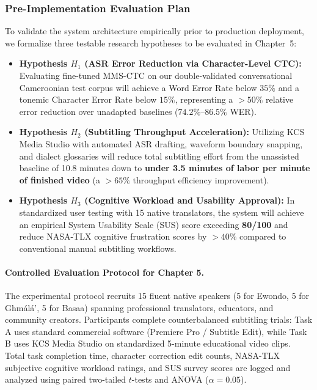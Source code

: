 \documentclass[a4paper,11pt]{article}
\begin{document}
\subsubsection{Pre-Implementation Evaluation Plan}
\label{sec:chap3_gov_evalplan}
To validate the system architecture empirically prior to production deployment, we formalize three testable research hypotheses to be evaluated in Chapter~5:
\begin{itemize}
    \item \textbf{Hypothesis $H_1$ (ASR Error Reduction via Character-Level CTC):} Evaluating fine-tuned MMS-CTC on our double-validated conversational Cameroonian test corpus will achieve a Word Error Rate below $35\%$ and a tonemic Character Error Rate below $15\%$, representing a $>50\%$ relative error reduction over unadapted baselines ($74.2\%\text{--}86.5\%$ WER).
    \item \textbf{Hypothesis $H_2$ (Subtitling Throughput Acceleration):} Utilizing KCS Media Studio with automated ASR drafting, waveform boundary snapping, and dialect glossaries will reduce total subtitling effort from the unassisted baseline of 10.8 minutes down to \textbf{under 3.5 minutes of labor per minute of finished video} (a $>65\%$ throughput efficiency improvement).
    \item \textbf{Hypothesis $H_3$ (Cognitive Workload and Usability Approval):} In standardized user testing with 15 native translators, the system will achieve an empirical System Usability Scale (SUS) score exceeding \textbf{80/100} and reduce NASA-TLX cognitive frustration scores by $>40\%$ compared to conventional manual subtitling workflows.
\end{itemize}

\paragraph{Controlled Evaluation Protocol for Chapter 5.}
The experimental protocol recruits 15 fluent native speakers (5 for Ewondo, 5 for Gh\textopeno m\'al\'a', 5 for Basaa) spanning professional translators, educators, and community creators. Participants complete counterbalanced subtitling trials: Task A uses standard commercial software (Premiere Pro / Subtitle Edit), while Task B uses KCS Media Studio on standardized 5-minute educational video clips. Total task completion time, character correction edit counts, NASA-TLX subjective cognitive workload ratings, and SUS survey scores are logged and analyzed using paired two-tailed $t$-tests and ANOVA ($\alpha = 0.05$).
\end{document}
